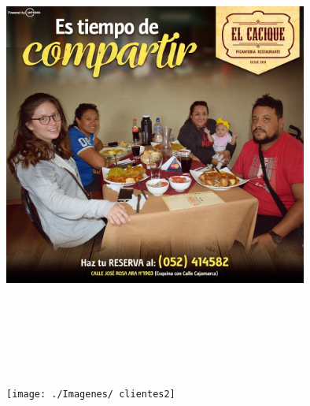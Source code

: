 \begin{enumerate}[1.]
	\begin{center}
	\includegraphics[width=10cm]{./Imagenes/clientes} 
	\end{center}
\\ 
\\ 
\\ 
\\ 
\\ 
	\begin{center}
	\texttt{[image: ./Imagenes/ clientes2]} 
	\end{center}



\end{enumerate} 
